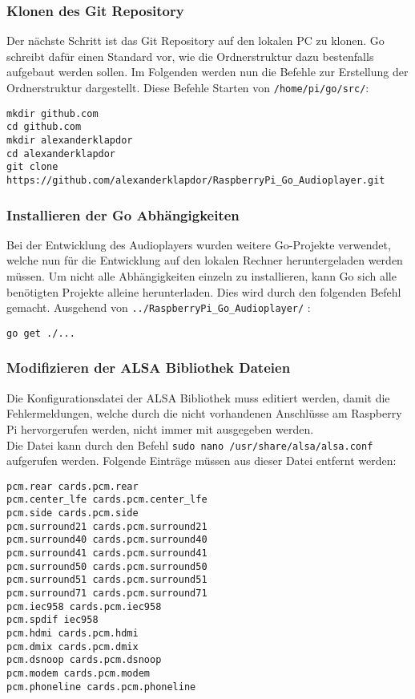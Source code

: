 \begin{enumerate}
\end{enumerate}

\subsubsection{Klonen des Git Repository}
Der nächste Schritt ist das Git Repository auf den lokalen PC zu klonen. Go
schreibt dafür einen Standard vor, wie die Ordnerstruktur dazu bestenfalls
aufgebaut werden sollen. Im Folgenden werden nun die Befehle zur Erstellung der
Ordnerstruktur dargestellt. Diese Befehle Starten von \verb|/home/pi/go/src/|:
\begin{lstlisting}[caption={Klonen des Git Repository}]
mkdir github.com 
cd github.com
mkdir alexanderklapdor
cd alexanderklapdor
git clone https://github.com/alexanderklapdor/RaspberryPi_Go_Audioplayer.git
\end{lstlisting}

\subsubsection{Installieren der Go Abhängigkeiten}
Bei der Entwicklung des Audioplayers wurden weitere Go-Projekte verwendet,
welche nun für die Entwicklung auf den lokalen Rechner heruntergeladen werden
müssen. Um nicht alle Abhängigkeiten einzeln zu installieren, kann Go sich alle
benötigten Projekte alleine herunterladen. Dies wird durch den folgenden Befehl
gemacht.
Ausgehend von \verb|../RaspberryPi_Go_Audioplayer/| :
\begin{lstlisting}[caption={Installieren von Go Abhängigkeiten}]
go get ./... 
\end{lstlisting}

\subsubsection{Modifizieren der \acs{ALSA} Bibliothek Dateien}
Die Konfigurationsdatei der \acf{ALSA} Bibliothek muss editiert werden, damit die
Fehlermeldungen, welche durch die nicht vorhandenen Anschlüsse am Raspberry Pi
hervorgerufen werden, nicht immer mit ausgegeben werden. \\
Die Datei kann durch den Befehl \verb|sudo nano /usr/share/alsa/alsa.conf| aufgerufen werden. \newline
Folgende Einträge müssen aus dieser Datei entfernt werden:
\begin{lstlisting}[caption={Liste der zu löschenden Einträge}]
pcm.rear cards.pcm.rear 
pcm.center_lfe cards.pcm.center_lfe 
pcm.side cards.pcm.side 
pcm.surround21 cards.pcm.surround21 
pcm.surround40 cards.pcm.surround40 
pcm.surround41 cards.pcm.surround41 
pcm.surround50 cards.pcm.surround50 
pcm.surround51 cards.pcm.surround51 
pcm.surround71 cards.pcm.surround71 
pcm.iec958 cards.pcm.iec958 
pcm.spdif iec958 
pcm.hdmi cards.pcm.hdmi 
pcm.dmix cards.pcm.dmix 
pcm.dsnoop cards.pcm.dsnoop 
pcm.modem cards.pcm.modem 
pcm.phoneline cards.pcm.phoneline
\end{lstlisting}

